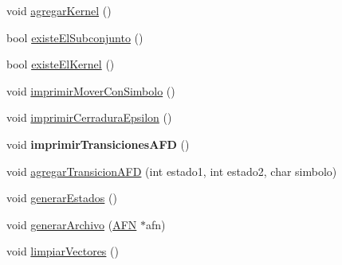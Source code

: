 \begin{DoxyCompactItemize}
\item 
void \hyperlink{class_subconjunto_a665f23eb3984050eef0a6b5cf6e81b57}{agregar\+Kernel} ()
\item 
bool \hyperlink{class_subconjunto_aebb67390c197c1b98c9fe29835e7b8e5}{existe\+El\+Subconjunto} ()
\item 
bool \hyperlink{class_subconjunto_af63dd50101bf38f6192adc52bd7615a7}{existe\+El\+Kernel} ()
\item 
void \hyperlink{class_subconjunto_a044116b31b133c7e15b75f5260424a07}{imprimir\+Mover\+Con\+Simbolo} ()
\item 
void \hyperlink{class_subconjunto_a53a556d6ce862720294cb2006d446717}{imprimir\+Cerradura\+Epsilon} ()
\item 
\mbox{\label{class_subconjunto_ad37020c9f9e9a8732ff5214769b50b32}} 
void {\bfseries imprimir\+Transiciones\+A\+FD} ()
\item 
void \hyperlink{class_subconjunto_a244094bad3df640fe76b10ce9dde80a2}{agregar\+Transicion\+A\+FD} (int estado1, int estado2, char simbolo)
\item 
void \hyperlink{class_subconjunto_aff47f0dcf2f97880af46f1bf55d94525}{generar\+Estados} ()
\item 
void \hyperlink{class_subconjunto_a55803aec00fc222e2b7ad40b9fde53d2}{generar\+Archivo} (\hyperlink{class_a_f_n}{A\+FN} $\ast$afn)
\item 
void \hyperlink{class_subconjunto_abab1a98d217cac674ceed298af7c88f0}{limpiar\+Vectores} ()
\end{DoxyCompactItemize}
